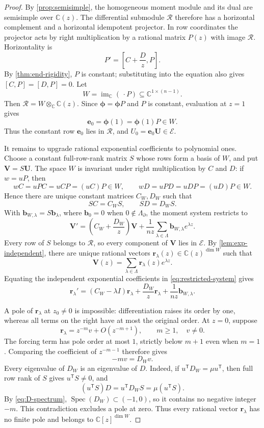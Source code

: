 \documentclass[11pt]{article}
\numberwithin{equation}{section}
\theoremstyle{definition}
\theoremstyle{remark}
\newcommand{\C}{\mathbb C}
\newcommand{\Spec}{\operatorname{Spec}}
\newcommand{\Ecal}{\mathcal E}
\newcommand{\Rcal}{\mathcal R}
\begin{document}
\begin{proof}
By \cref{prop:semisimple}, the homogeneous moment module and its dual are
semisimple over $\C(z)$.  The differential submodule $\Rcal$ therefore has a
horizontal complement and a horizontal idempotent projector.  In row
coordinates the projector acts by right multiplication by a rational matrix
$P(z)$ with image $\Rcal$.  Horizontality is
\[
  P'=\left[C+\frac Dz,P\right].
\]
By \cref{thm:end-rigidity}, $P$ is constant; substituting into the equation
also gives $[C,P]=[D,P]=0$.  Let
\[
  W=\operatorname{im}_{\C}(\,\cdot P)
  \subseteq\C^{1\times(n-1)}.
\]
Then $\Rcal=W\otimes_\C\C(z)$.  Since
$\boldsymbol\phi=\boldsymbol\phi P$ and $P$ is constant, evaluation at
$z=1$ gives
\[
  \mathbf e_0=\boldsymbol\phi(1)=\boldsymbol\phi(1)P\in W.
\]
Thus the constant row $\mathbf e_0$ lies in $\Rcal$, and
$U_0=\mathbf e_0\mathbf U\in\Ecal$.

It remains to upgrade rational exponential coefficients to polynomial ones.
Choose a constant full-row-rank matrix $S$ whose rows form a basis of $W$, and
put $\mathbf V=S\mathbf U$.  The space $W$ is invariant under right
multiplication by $C$ and $D$: if $w=uP$, then
\[
  wC=uPC=uCP=(uC)P\in W,
  \qquad
  wD=uPD=uDP=(uD)P\in W.
\]
Hence there are unique constant matrices $C_W,D_W$ such that
\[
  SC=C_WS,
  \qquad
  SD=D_WS.
\]
With $\mathbf b_{W,\lambda}=S\mathbf b_\lambda$, where
$\mathbf b_0=0$ when $0\notin\Lambda_\partial$, the moment system restricts
to
\begin{equation}\label{eq:restricted-system}
  \mathbf V'
  =\left(C_W+\frac{D_W}{z}\right)\mathbf V
  +\frac1{nz}\sum_{\lambda\in\Lambda}
   \mathbf b_{W,\lambda}e^{\lambda z}.
\end{equation}
Every row of $S$ belongs to $\Rcal$, so every component of $\mathbf V$ lies
in $\Ecal$.  By \cref{lem:exp-independent}, there are unique rational vectors
$\mathbf r_\lambda(z)\in\C(z)^{\dim W}$ such that
\[
  \mathbf V(z)=\sum_{\lambda\in\Lambda}
  \mathbf r_\lambda(z)e^{\lambda z}.
\]
Equating the independent exponential coefficients in
\eqref{eq:restricted-system} gives
\begin{equation}\label{eq:restricted-block}
  \mathbf r_\lambda'
  =(C_W-\lambda I)\mathbf r_\lambda
  +\frac{D_W}{z}\mathbf r_\lambda
  +\frac1{nz}\mathbf b_{W,\lambda}.
\end{equation}

A pole of $\mathbf r_\lambda$ at $z_0\ne0$ is impossible: differentiation
raises its order by one, whereas all terms on the right have at most the
original order.  At $z=0$, suppose
\[
  \mathbf r_\lambda=z^{-m}v+O(z^{-m+1}),
  \qquad m\ge1,
  \quad v\ne0.
\]
The forcing term has pole order at most $1$, strictly below $m+1$ even when
$m=1$.  Comparing the coefficient of $z^{-m-1}$ therefore gives
\[
  -mv=D_Wv.
\]
Every eigenvalue of $D_W$ is an eigenvalue of $D$.  Indeed, if
$u^{\mathsf T}D_W=\mu u^{\mathsf T}$, then full row rank of $S$ gives
$u^{\mathsf T}S\ne0$, and
\[
  (u^{\mathsf T}S)D
  =u^{\mathsf T}D_WS
  =\mu(u^{\mathsf T}S).
\]
By \eqref{eq:D-spectrum}, $\Spec(D_W)\subset(-1,0)$, so it contains no
negative integer $-m$.  This contradiction excludes a pole at zero.  Thus
every rational vector $\mathbf r_\lambda$ has no finite pole and belongs to
$\C[z]^{\dim W}$.


\end{proof}
\end{document}
